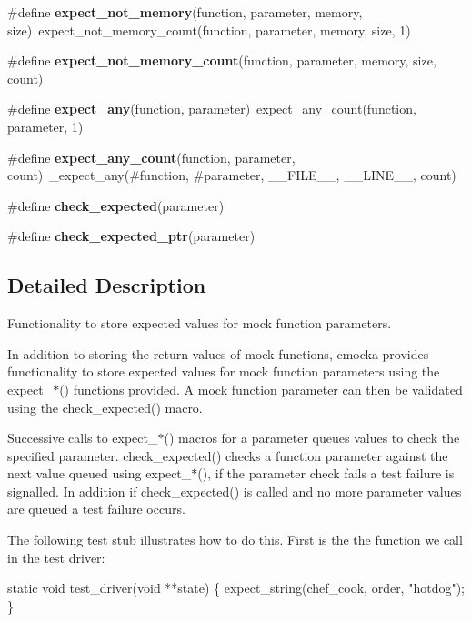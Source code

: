 \begin{DoxyCompactItemize}
\#define {\bfseries expect\+\_\+not\+\_\+memory}(function,  parameter,  memory,  size)~expect\+\_\+not\+\_\+memory\+\_\+count(function, parameter, memory, size, 1)
\item 
\#define {\bfseries expect\+\_\+not\+\_\+memory\+\_\+count}(function,  parameter,  memory,  size,  count)
\item 
\mbox{\label{group__cmocka__param_ga8782b2b988f6b8b336f2b54905924d23}} 
\#define {\bfseries expect\+\_\+any}(function,  parameter)~expect\+\_\+any\+\_\+count(function, parameter, 1)
\item 
\mbox{\label{group__cmocka__param_gae613523137164d392a4f963562daeb5d}} 
\#define {\bfseries expect\+\_\+any\+\_\+count}(function,  parameter,  count)~\+\_\+expect\+\_\+any(\#function, \#parameter, \+\_\+\+\_\+\+F\+I\+L\+E\+\_\+\+\_\+, \+\_\+\+\_\+\+L\+I\+N\+E\+\_\+\+\_\+, count)
\item 
\#define {\bfseries check\+\_\+expected}(parameter)
\item 
\#define {\bfseries check\+\_\+expected\+\_\+ptr}(parameter)
\end{DoxyCompactItemize}


\subsection{Detailed Description}
Functionality to store expected values for mock function parameters.

In addition to storing the return values of mock functions, cmocka provides functionality to store expected values for mock function parameters using the expect\+\_\+$\ast$() functions provided. A mock function parameter can then be validated using the check\+\_\+expected() macro.

Successive calls to expect\+\_\+$\ast$() macros for a parameter queues values to check the specified parameter. check\+\_\+expected() checks a function parameter against the next value queued using expect\+\_\+$\ast$(), if the parameter check fails a test failure is signalled. In addition if check\+\_\+expected() is called and no more parameter values are queued a test failure occurs.

The following test stub illustrates how to do this. First is the the function we call in the test driver\+:


\begin{DoxyCode}
\textcolor{keyword}{static} \textcolor{keywordtype}{void} test\_driver(\textcolor{keywordtype}{void} **state)
\{
    expect\_string(chef\_cook, order, \textcolor{stringliteral}{"hotdog"});
\}
\end{DoxyCode}


